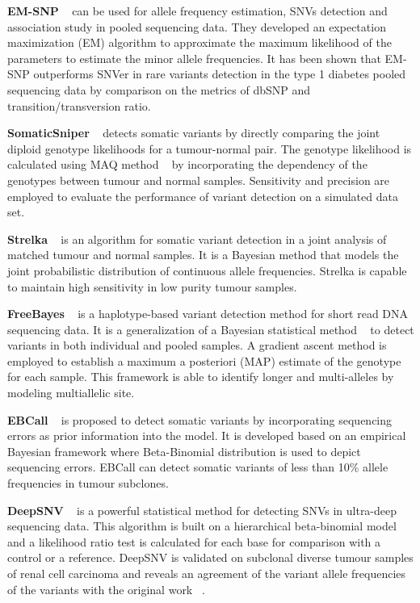 \documentclass[11pt,reqno]{amsart}
\begin{document}
\textbf{EM-SNP} ~\citep{Chen2013} can be used for allele frequency estimation, SNVs detection and association study in pooled sequencing data.
They developed an expectation maximization (EM) algorithm to approximate the maximum likelihood of the parameters to estimate the minor allele frequencies.
It has been shown that EM-SNP outperforms SNVer in rare variants detection in the type 1 diabetes pooled sequencing data by comparison on the metrics of dbSNP and transition/transversion ratio.


\textbf{SomaticSniper} ~\citep{Larson2012} detects somatic variants by directly comparing the joint diploid genotype likelihoods for a tumour-normal pair.
The genotype likelihood is calculated using MAQ method ~\citep{Li2008} by incorporating the dependency of the genotypes between tumour and normal samples.
Sensitivity and precision are employed to evaluate the performance of variant detection on a simulated data set.

\textbf{Strelka} ~\citep{Saunders2012} is an algorithm for somatic variant detection in a joint analysis of matched tumour and normal samples.
It is a Bayesian method that models the joint probabilistic distribution of continuous allele frequencies.
Strelka is capable to maintain high sensitivity in low purity tumour samples.

\textbf{FreeBayes} ~\citep{Garrison2012} is a haplotype-based variant detection method for short read DNA sequencing data.
It is a generalization of a Bayesian statistical method ~\citep{marth1999general} to detect variants in both individual and pooled samples.
A gradient ascent method is employed to establish a maximum a posteriori (MAP) estimate of the genotype for each sample.
This framework is able to identify longer and multi-alleles by modeling multiallelic site.

\textbf{EBCall} ~\citep{Shiraishi2013} is proposed to detect somatic variants by incorporating sequencing errors as prior information into the model.
It is developed based on an empirical Bayesian framework where Beta-Binomial distribution is used to depict sequencing errors.
EBCall can detect somatic variants of less than 10\% allele frequencies in tumour subclones.

\textbf{DeepSNV} ~\citep{gerstung2012reliable} is a powerful statistical method for detecting SNVs in ultra-deep sequencing data.
This algorithm is built on a hierarchical beta-binomial model and a likelihood ratio test is calculated for each base for comparison with a control or a reference.
DeepSNV is validated on subclonal diverse tumour samples of renal cell carcinoma and reveals an agreement of the variant allele frequencies of the variants with the original work ~\citep{gerstung2012reliable}.
\end{document}
